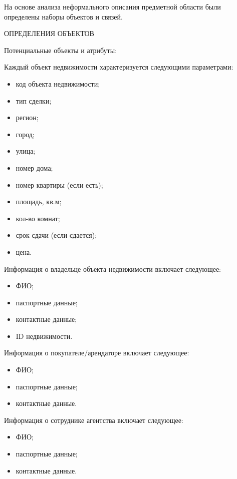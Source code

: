На основе анализа неформального описания предметной области были определены наборы объектов и связей. 

ОПРЕДЕЛЕНИЯ ОБЪЕКТОВ

Потенциальные объекты и атрибуты:

Каждый объект недвижимости характеризуется следующими параметрами:
\begin{itemize}
\item	код объекта недвижимости;

\item	тип сделки;

\item	регион;

\item	город;

\item	улица;

\item	номер дома;

\item	номер квартиры (если есть);

\item	площадь, кв.м;

\item	кол-во комнат;

\item	срок сдачи (если сдается);

\item	цена.
\end{itemize}
Информация о владельце объекта недвижимости включает следующее:
\begin{itemize}
\item	ФИО;

\item	паспортные данные;

\item	контактные данные;

\item	ID недвижимости.
\end{itemize}
Информация о покупателе/арендаторе включает следующее:
\begin{itemize}
\item	ФИО;

\item	паспортные данные;

\item	контактные данные.
\end{itemize}
Информация о сотруднике агентства включает следующее:
\begin{itemize}
\item	ФИО;

\item	паспортные данные;

\item	контактные данные.

\end{itemize}
